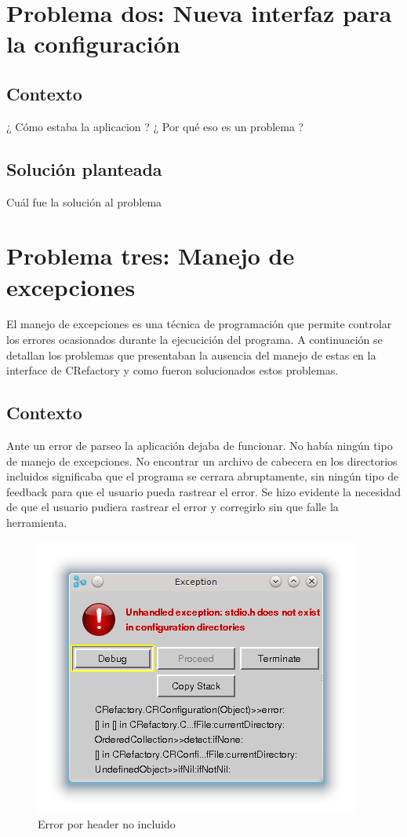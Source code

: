 \documentclass[a4paper,oneside,12pt]{article}
\begin{document}
\section{Problema dos: Nueva interfaz para la configuraci\'on}

\subsection{Contexto}
¿ C\'omo estaba la aplicacion ? ¿ Por qu\'e eso es un problema ?

\subsection{Soluci\'on planteada}
Cu\'al fue la soluci\'on al problema

\section{Problema tres: Manejo de excepciones}

El manejo de excepciones es una t\'ecnica de programaci\'on que permite controlar los errores ocasionados durante la ejecucici\'on del programa.
A continuaci\'on se detallan los problemas que presentaban la ausencia del manejo de estas en la interface de CRefactory y como fueron solucionados estos problemas.

\subsection{Contexto}
Ante un error de parseo la aplicación dejaba de funcionar. No había ningún tipo de manejo de excepciones. No encontrar un archivo de cabecera en los directorios incluidos significaba que el programa se cerrara abruptamente, sin ningún tipo de feedback para que el usuario pueda rastrear el error. Se hizo evidente la necesidad de que el usuario pudiera rastrear el error y corregirlo sin que falle la herramienta.

\begin{figure}[h!]
  \centering
    \includegraphics[scale=0.85]{images/codigo_original/error_header_no_agregado.png}
     \caption{Error por header no incluido}
\end{figure}
\end{document}
